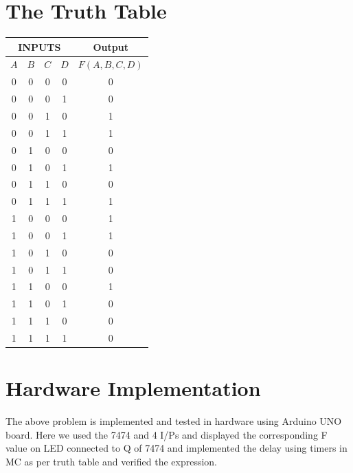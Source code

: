 \documentclass[a4paper,12pt]{article}
\begin{document}
\section*{\textbf{The Truth Table}}
\begin{center}
\begin{tabular}{|c|c|c|c|c|}
\hline
	\multicolumn{4}{|c|}{\textbf{INPUTS}} & \textbf{Output} \\ 
\hline
	$A$ & $B$ & $C$ & $D$ & $F(A,B,C,D)$ \\
\hline
0 & 0 & 0 & 0 & 0 \\ 
0 & 0 & 0 & 1 & 0 \\ 
0 & 0 & 1 & 0 & 1 \\ 
0 & 0 & 1 & 1 & 1 \\ 
0 & 1 & 0 & 0 & 0 \\ 
0 & 1 & 0 & 1 & 1 \\ 
0 & 1 & 1 & 0 & 0 \\ 
0 & 1 & 1 & 1 & 1 \\ 
1 & 0 & 0 & 0 & 1 \\ 
1 & 0 & 0 & 1 & 1 \\ 
1 & 0 & 1 & 0 & 0 \\ 
1 & 0 & 1 & 1 & 0 \\ 
1 & 1 & 0 & 0 & 1 \\ 
1 & 1 & 0 & 1 & 0 \\ 
1 & 1 & 1 & 0 & 0 \\ 
1 & 1 & 1 & 1 & 0 \\ 
\hline
\end{tabular}
\end{center}
\section*{\textbf{Hardware Implementation}}
The above problem is implemented and tested in hardware using Arduino UNO board. Here we used the 7474 and 4 I/Ps and displayed the corresponding F value on LED connected to Q of 7474 and implemented the delay using timers in MC as per truth table and verified the expression.
\end{document}

